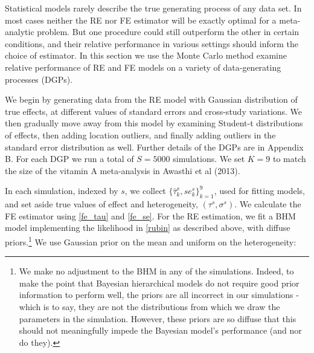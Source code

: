 \documentclass[12pt]{article}
\begin{document}
Statistical models rarely describe the true generating process of any data set. In most cases neither the RE nor FE estimator will be exactly optimal for a meta-analytic problem. But one procedure could still outperform the other in certain conditions, and their relative performance in various settings should inform the choice of estimator. In this section we use the Monte Carlo method examine relative performance of RE and FE models on a variety of data-generating processes (DGPs).

We begin by generating data from the RE model with Gaussian distribution of true effects, at different values of standard errors and cross-study variations. We then gradually move away from this model by examining Student-t distributions of effects, then adding location outliers, and finally adding outliers in the standard error distribution as well. Further details of the DGPs are in Appendix B. For each DGP we run a total of $S = 5000$ simulations. We set $K=9$ to match the size of the vitamin A meta-analysis in Awasthi et al (2013).

In each simulation, indexed by $s$, we collect $\{\hat{\tau}_k^s, se_k^s\}_{k=1}^9$, used for fitting models, and set aside true values of effect and heterogeneity, $(\tau^{s}, \sigma^{s})$. We calculate the FE estimator using \eqref{fe_tau} and \eqref{fe_se}. For the RE estimation, we fit a BHM model implementing the likelihood in \eqref{rubin} as described above, with diffuse priors.\footnote{We make no adjustment to the BHM in any of the simulations. Indeed, to make the point that Bayesian hierarchical models do not require good prior information to perform well, the priors are all incorrect in our simulations - which is to say, they are not the distributions from which we draw the parameters in the simulation. However, these priors are so diffuse that this should not meaningfully impede the Bayesian model's performance (and nor do they).} We use Gaussian prior on the mean and uniform on the heterogeneity:

% 
% 
\end{document}
